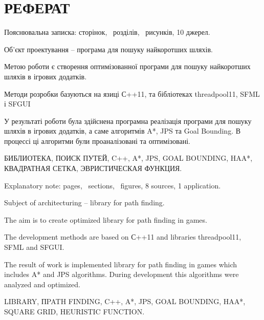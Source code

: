 \section*{РЕФЕРАТ}

\vspace{1\baselineskip}

\thispagestyle{empty}

Пояснювальна записка: \pageref{LastPage} сторінок, \totalsections\ розділів,  \totalfigures\ рисунків, 10 джерел.

Об'єкт проектування -- програма для пошуку найкоротших шляхів.

Метою роботи є створення оптимізованної програми для пошуку найкоротших шляхів в ігрових додатків.

Методи розробки базуються на язиці С++11, та бібліотеках threadpool11, SFML і SFGUI

У результаті роботи була здійснена програмна реалізація програми для пошуку шляхів в ігрових додатків, а саме алгоритмів A*, JPS та Goal Bounding. В процессі ці алгоритми були проаналізовані та оптимізовані.

БИБЛИОТЕКА, ПОИСК ПУТЕЙ, C++, A*, JPS, GOAL BOUNDING, HAA*, КВАДРАТНАЯ СЕТКА, ЭВРИСТИЧЕСКАЯ ФУНКЦИЯ.

\vspace{1\baselineskip}

Explanatory note: \pageref{LastPage} pages, \totalsections\ sections,  \totalfigures\ figures, 8 sources, 1 application.

Subject of architecturing -- library for path finding.

The aim is to create optimized library for path finding in games.

The development methods are based on С++11 and libraries threadpool11, SFML and SFGUI.

The result of work is implemented library for path finding in games which includes A* and JPS algorithms. During development this algorithms were analyzed and optimized.

LIBRARY, ПPATH FINDING, C++, A*, JPS, GOAL BOUNDING, HAA*, SQUARE GRID, HEURISTIC FUNCTION.